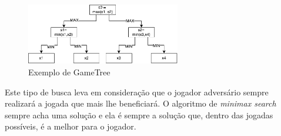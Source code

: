\begin{figure}[ht]
	\centering
	\includegraphics[width=0.6\textwidth]{fig/gametree.pdf}
	\caption{Exemplo de GameTree}
	\label{fig:gametree}
\end{figure} 

Este tipo de busca leva em consideração que o jogador adversário sempre realizará a jogada que mais lhe beneficiará. O algoritmo de \textit{minimax search} sempre acha uma solução e ela é sempre a solução que, dentro das jogadas possíveis, é a melhor para o jogador.  


